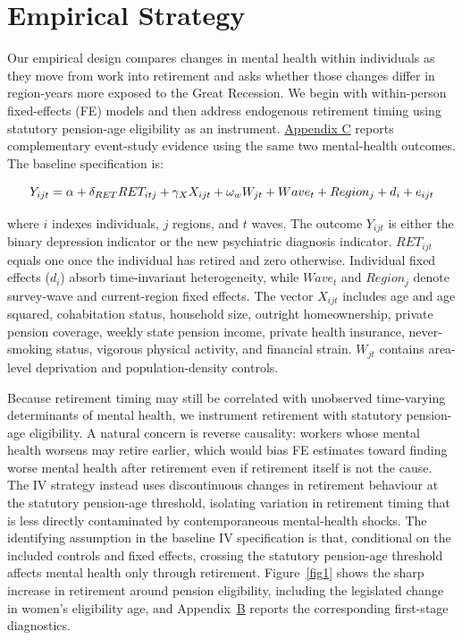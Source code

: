 \documentclass[arguments, manuscript, 11pt]{aastex631}
\begin{document}
\FloatBarrier

\section{Empirical Strategy} \label{sec:empirical}

Our empirical design compares changes in mental health within individuals as they move from work into retirement and asks whether those changes differ in region-years more exposed to the Great Recession. We begin with within-person fixed-effects (FE) models and then address endogenous retirement timing using statutory pension-age eligibility as an instrument. \hyperref[sec:appendixC]{Appendix C} reports complementary event-study evidence using the same two mental-health outcomes. The baseline specification is:

\begin{equation}
\label{eq1}
\centering
  Y_{ijt} =\alpha + \delta_{RET} RET_{itj} + \gamma_X X_{ijt} + \omega_w W_{jt} + Wave_{t} + Region_j + d_i + e_{ijt} 
\end{equation}

where $i$ indexes individuals, $j$ regions, and $t$ waves. The outcome $Y_{ijt}$ is either the binary depression indicator or the new psychiatric diagnosis indicator. $RET_{ijt}$ equals one once the individual has retired and zero otherwise. Individual fixed effects ($d_i$) absorb time-invariant heterogeneity, while $Wave_t$ and $Region_j$ denote survey-wave and current-region fixed effects. The vector $X_{ijt}$ includes age and age squared, cohabitation status, household size, outright homeownership, private pension coverage, weekly state pension income, private health insurance, never-smoking status, vigorous physical activity, and financial strain. $W_{jt}$ contains area-level deprivation and population-density controls.

Because retirement timing may still be correlated with unobserved time-varying determinants of mental health, we instrument retirement with statutory pension-age eligibility. A natural concern is reverse causality: workers whose mental health worsens may retire earlier, which would bias FE estimates toward finding worse mental health after retirement even if retirement itself is not the cause. The IV strategy instead uses discontinuous changes in retirement behaviour at the statutory pension-age threshold, isolating variation in retirement timing that is less directly contaminated by contemporaneous mental-health shocks. The identifying assumption in the baseline IV specification is that, conditional on the included controls and fixed effects, crossing the statutory pension-age threshold affects mental health only through retirement. Figure~\ref{fig1} shows the sharp increase in retirement around pension eligibility, including the legislated change in women's eligibility age, and Appendix~\hyperref[sec:appendixB]{B} reports the corresponding first-stage diagnostics.
\end{document}
